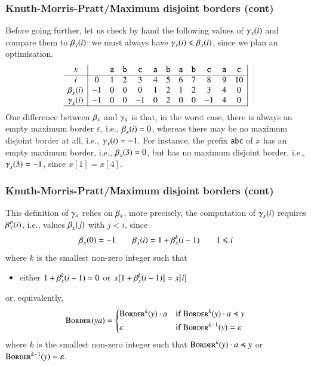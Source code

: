 %
\begin{frame}
\frametitle{Knuth-Morris-Pratt/Maximum disjoint borders (cont)}

Before going further, let us check by hand the following values of
\(\gamma_{x}^{}(i)\) and compare them to \(\beta_{x}^{}(i)\): we must
always have \(\gamma_{x}^{}(i) \leqslant \beta_{x}^{}(i)\), since we
plan an optimisation.
\[
\begin{array}{c|ccccccccccc|}
x & & \texttt{a} & \texttt{b} & \texttt{c} & \texttt{a}
  & \texttt{b} & \texttt{a} & \texttt{b} & \texttt{c}
  & \texttt{a} & \texttt{c}\\
\hline
                  i  &  0 & 1 & 2 &  3 & 4 & 5 & 6 & 7 &  8 & 9 & 10\\
   \beta_{x}^{}(i) & -1 & 0 & 0 &  0 & 1 & 2 & 1 & 2 &  3 & 4 &  0\\
  \gamma_{x}^{}(i) & -1 & 0 & 0 & -1 & 0 & 2 & 0 & 0 & -1 & 4 &  0\\
\hline
\end{array}
\]
One difference between \(\beta_{x}\) and
\(\gamma_{x}\) is that, in the worst case, there is always an
empty maximum border \(\varepsilon\), i.e., \(\beta_{x}^{}(i) = 0\),
whereas there may be no maximum disjoint border at all,
i.e., \(\gamma_{x}^{}(i) = -1\). For instance, the prefix
\texttt{abc} of \(x\) has an empty maximum border,
i.e., \(\beta_{x}^{}(3)=0\), but has no maximum disjoint border,
i.e., \(\gamma_{x}^{}(3) = -1\), since \(x[1] = x[4]\).

\end{frame}

%
\begin{frame}
\frametitle{Knuth-Morris-Pratt/Maximum disjoint borders (cont)}

This definition of \(\gamma_{x}\) relies on
\(\beta_{x}\), more precisely, the computation of
\(\gamma_{x}^{}(i)\) requires \(\beta_{x}^{p}(i)\), i.e.,
values \(\beta_{x}^{}(j)\) with \(j < i\), since
\[
\beta_{x}^{}(0) = -1
\qquad \beta_{x}^{}(i) = 1 + \beta_{x}^{k}(i-1)
\qquad 1 \leqslant i
\]
where \(k\) is the smallest non-zero integer such that
\begin{itemize}

  \item either \(1 + \beta_{x}^{k}(i-1) = 0\) or
    \(x[1+\beta_{x}^{k}(i-1)] = x[i]\)

\end{itemize}
or, equivalently,
\[
\textsc{Border}^{}(ya) =
\left\{
  \begin{aligned}
   & \textsc{Border}^{k}(y) \cdot a
   && \text{if} \; \textsc{Border}^{k}(y) \cdot a \preccurlyeq y\\
   & \varepsilon
   && \text{if} \; \textsc{Border}^{k-1}(y) = \varepsilon
  \end{aligned}
\right.
\]
where \(k\) is the smallest non-zero integer such that \(\textsc{Border}^{k}(y)
\cdot a \preccurlyeq y\) or \(\textsc{Border}^{k-1}(y) = \varepsilon\).

\end{frame}

